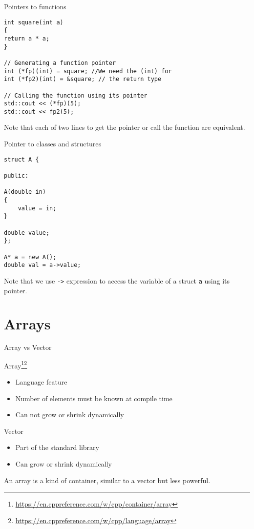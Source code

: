 \documentclass[\classoption]{beamer}
\begin{document}
\begin{frame}[fragile]{Pointers to functions}

\begin{lstlisting}
int square(int a)
{
return a * a;
}

// Generating a function pointer
int (*fp)(int) = square; //We need the (int) for
int (*fp2)(int) = &square; // the return type

// Calling the function using its pointer
std::cout << (*fp)(5);
std::cout << fp2(5);

\end{lstlisting}
Note that each of two lines to get the pointer or call the function are equivalent. 

\end{frame}


\begin{frame}[fragile]{Pointer to classes and structures}

\begin{lstlisting}
struct A {

public: 

A(double in)
{
	value = in;
}

double value;
};

A* a = new A();
double val = a->value;

\end{lstlisting}

Note that we use \lstinline|->| expression to access the variable of a struct \lstinline|a|
using its pointer.


\end{frame}

\section{Arrays}

\begin{frame}{Array vs Vector}


\begin{block}{Array\footnote{\tiny\url{https://en.cppreference.com/w/cpp/container/array}}\footnote{\tiny\url{https://en.cppreference.com/w/cpp/language/array}}}
\begin{itemize}
\item Language feature
\item Number of elements must be known at compile time
\item Can not grow or shrink dynamically
\end{itemize}
\end{block}

\begin{block}{Vector}
\begin{itemize}
\item Part of the standard library
\item Can grow or shrink dynamically
\end{itemize}
\end{block}
An array is a kind of container, similar to a vector but less powerful.
\end{frame}
\end{document}
